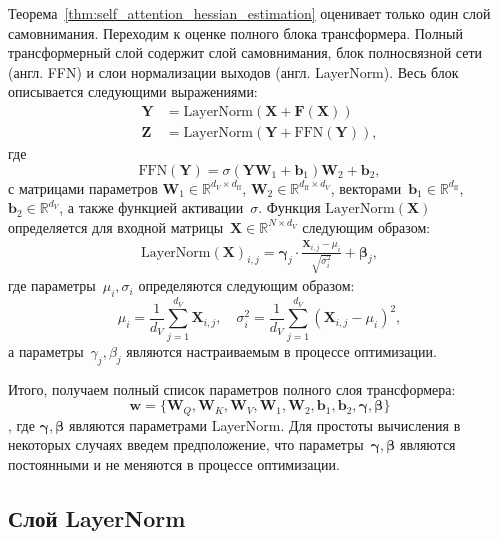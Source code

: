 Теорема~\ref{thm:self_attention_hessian_estimation} оценивает только один слой самовнимания. Переходим к оценке полного блока трансформера. Полный трансформерный слой содержит слой самовнимания, блок полносвязной сети (англ. FFN) и слои нормализации выходов (англ. LayerNorm). Весь блок описывается следующими выражениями:
\begin{align}\label{eq:transformer}
    \mathbf{Y} &= \text{LayerNorm}(\mathbf{X} + \mathbf{F}(\mathbf{X})) \\ 
    \mathbf{Z} &= \text{LayerNorm}(\mathbf{Y} + \text{FFN}(\mathbf{Y})), 
\end{align} 
где
\[
    \text{FFN}(\mathbf{Y}) = \sigma(\mathbf{Y} \mathbf{W}_1 + \mathbf{b}_1) \mathbf{W}_2 + \mathbf{b}_2,
\]
с матрицами параметров $\mathbf{W}_1 \in \mathbb{R}^{d_V \times d_{\text{ff}}}$, $\mathbf{W}_2 \in \mathbb{R}^{d_{\text{ff}} \times d_V}$, векторами~$\mathbf{b}_1 \in \mathbb{R}^{d_{\text{ff}}}$, $\mathbf{b}_2 \in \mathbb{R}^{d_V}$, а также функцией активации~$\sigma$.
Функция $\text{LayerNorm}(\mathbf{X})$ определяется для входной матрицы~$\mathbf{X} \in \mathbb{R}^{N \times d_V}$ следующим образом:
\begin{align}
    \text{LayerNorm}(\mathbf{X})_{i,j} = \mathbf{\gamma}_j \cdot \frac{\mathbf{X}_{i,j} - \mu_i}{\sqrt{\sigma_i^2}} + \mathbf{\beta}_j,
\end{align}
где параметры~$\mu_i, \sigma_i$ определяются следующим образом:
\[
    \mu_i = \frac{1}{d_V} \sum_{j=1}^{d_V} \mathbf{X}_{i,j}, \quad \sigma_i^2 = \frac{1}{d_V} \sum_{j=1}^{d_V} (\mathbf{X}_{i,j} - \mu_i)^2,
\]
а параметры~$\gamma_j, \beta_j$ являются настраиваемым в процессе оптимизации.

Итого, получаем полный список параметров полного слоя трансформера:
\[
    \mathbf{w} = \{\mathbf{W}_Q, \mathbf{W}_K, \mathbf{W}_V, \mathbf{W}_1, \mathbf{W}_2, \mathbf{b}_1, \mathbf{b}_2, \mathbf{\gamma}, \mathbf{\beta}\}
\], где $\mathbf{\gamma},\mathbf{\beta}$ являются параметрами LayerNorm. Для простоты вычисления в некоторых случаях введем предположение, что параметры~$\mathbf{\gamma},\mathbf{\beta}$ являются постоянными и не меняются в процессе оптимизации.

\subsection{Слой LayerNorm}

